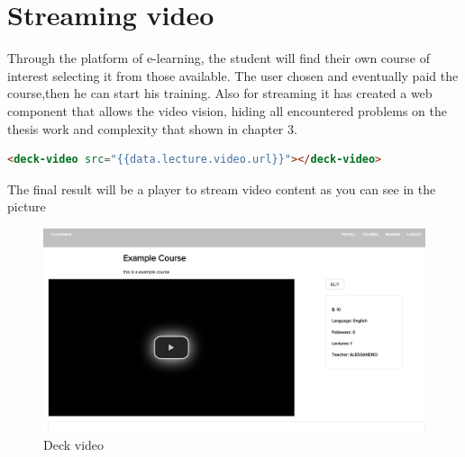 \section{Streaming video}
\label{sec:attend_the_course}

Through the platform of e-learning, the student will find their own course of interest selecting it from those available.
The user chosen and eventually paid the course,then he can start his training.
Also for streaming it has created a web component that allows the video vision, hiding all  encountered problems on the thesis work and complexity that shown in chapter 3.

\begin{lstlisting}[language=html]
       <deck-video src="{{data.lecture.video.url}}"></deck-video>
\end{lstlisting}

The final result will be a player to stream video content as you can see in the picture

\begin{figure}[htb]
 \centering
 \includegraphics[width=1.0\linewidth]{images/chapter6/deck_video.png}\hfill
 \caption[Deck video]{Deck video}
 \label{fig:fourV}
\end{figure}
